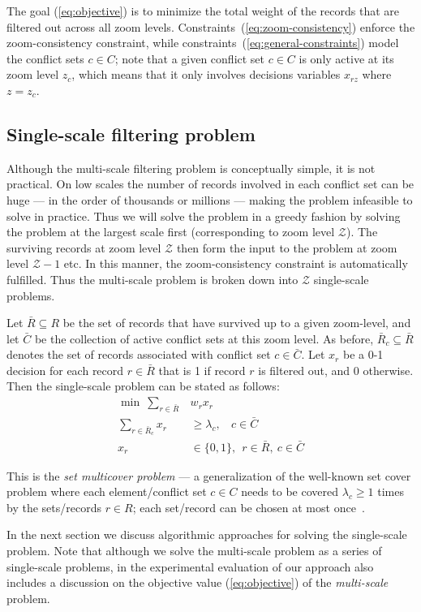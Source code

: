 The goal (\ref{eq:objective}) is to minimize the total weight of the records that are filtered out across all zoom levels. Constraints~(\ref{eq:zoom-consistency}) enforce the zoom-consistency constraint, while constraints~(\ref{eq:general-constraints}) model the conflict sets $c \in C$; note that a given conflict set $c \in C$ is only active at its zoom level $z_c$, which means that it only involves decisions variables $x_{rz}$ where $z = z_c$.

\subsection{Single-scale filtering problem}

Although the multi-scale filtering problem is conceptually simple, it is not practical. On low scales the number of records involved in each conflict set can be huge --- in the order of thousands or millions --- making the problem infeasible to solve in practice. Thus we will solve the problem in a greedy fashion by solving the problem at the largest scale first (corresponding to zoom level $\mathcal{Z}$). The surviving records at zoom level $\mathcal{Z}$ then form the input to the problem at zoom level $\mathcal{Z}-1$ etc. In this manner, the zoom-consistency constraint is automatically fulfilled. Thus the multi-scale problem is broken down into $\mathcal{Z}$ single-scale problems.

Let $\bar{R} \subseteq R$ be the set of records that have survived up to a given zoom-level, and let $\bar{C}$ be the collection of active conflict sets at this zoom level. As before, $\bar{R}_c \subseteq \bar{R}$ denotes the set of records associated with conflict set $c \in \bar{C}$. Let $x_r$ be a 0-1 decision for each record $r \in \bar{R}$ that is 1 if record $r$ is filtered out, and 0 otherwise. Then the single-scale problem can be stated as follows:
\begin{align}
  \label{eq:objective-single}
  \min ~\sum_{r \in \bar{R}} &w_r x_r \\
  \label{eq:general-constraints-single}
  \sum_{r \in \bar{R}_c} x_r &\geq \lambda_c, ~~~~ c \in \bar{C} \\
  x_r & \in \{0, 1\}, ~~ r \in \bar{R}, ~c \in \bar{C}
\end{align}

This is the \emph{set multicover problem} --- a generalization of the well-known set cover problem where each element/conflict set $c \in C$ needs to be covered $\lambda_c \geq 1$ times by the sets/records $r \in R$; each set/record can be chosen at most once~\cite{rajagopalan1998primal}. 

In the next section we discuss algorithmic approaches for solving the single-scale problem. Note that although we solve the multi-scale problem as a series of single-scale problems, in the experimental evaluation of our approach also includes a discussion on the objective value (\ref{eq:objective}) of the \emph{multi-scale} problem. 

